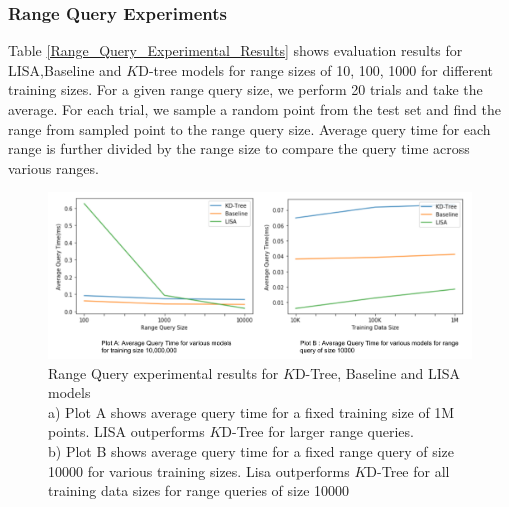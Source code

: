\subsubsection {Range Query Experiments}
Table \ref{Range_Query_Experimental_Results} shows evaluation results for LISA,Baseline and $K$D-tree models for range sizes of 10, 100, 1000 for different training sizes. For a given range query size, we perform 20 trials and take the average. For each trial, we sample a random point from the test set and find the range from sampled point to the range query size. Average query time for each range is further divided by the range size to compare the query time across various ranges. 

\begin{figure}
    \centering
    \includegraphics[width=1.1\textwidth]{graphs/evaluation/RangeQueryPlot.pdf}
    \caption{Range Query experimental results for $K$D-Tree, Baseline and LISA models\\
    a) Plot A shows average query time for a fixed training size of 1M points. LISA outperforms $K$D-Tree for larger range queries. \\
     b) Plot B shows average query time for a fixed range query of size 10000 for various training sizes. Lisa outperforms $K$D-Tree for all training data sizes for range queries of size 10000 }
    \label{fig:Range_Query_Comparision}
\end{figure}


